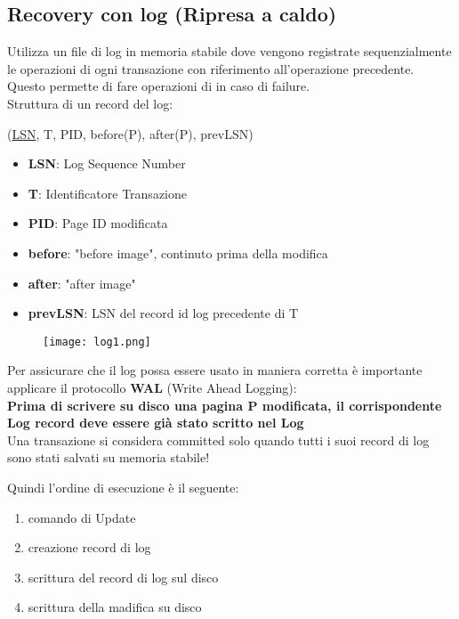 \subsection{Recovery con log (Ripresa a caldo)}
Utilizza un file di log in memoria stabile dove vengono registrate sequenzialmente le operazioni di ogni transazione con riferimento all'operazione precedente. Questo permette di fare operazioni di  in caso di failure.\\
Struttura di un record del log:
\begin{center}
    (\underline{LSN}, T, PID, before(P), after(P), prevLSN)
\end{center}
\begin{itemize}
    \item \textbf{LSN}: Log Sequence Number
    \item \textbf{T}: Identificatore Transazione
    \item \textbf{PID}: Page ID modificata
    \item \textbf{before}: "before image", continuto prima della modifica
    \item \textbf{after}: "after image"
    \item \textbf{prevLSN}: LSN del record id log precedente di T
\end{itemize}
\begin{figure}[H]
    \centering
    \texttt{[image: log1.png]}
    \label{fig:log1}
\end{figure}
Per assicurare che il log possa essere usato in maniera corretta \`e importante applicare il protocollo \textbf{WAL} (Write Ahead Logging):\\
\textbf{Prima di scrivere su disco una pagina P modificata, il corrispondente Log record deve essere già stato scritto nel Log}\\
Una transazione si considera committed solo quando tutti i suoi record di log sono stati salvati su memoria stabile!

\break
\noindent Quindi l'ordine di esecuzione \`e il seguente:
\begin{enumerate}
    \item comando di Update
    \item creazione record di log
    \item scrittura del record di log sul disco
    \item scrittura della madifica su disco
\end{enumerate}

